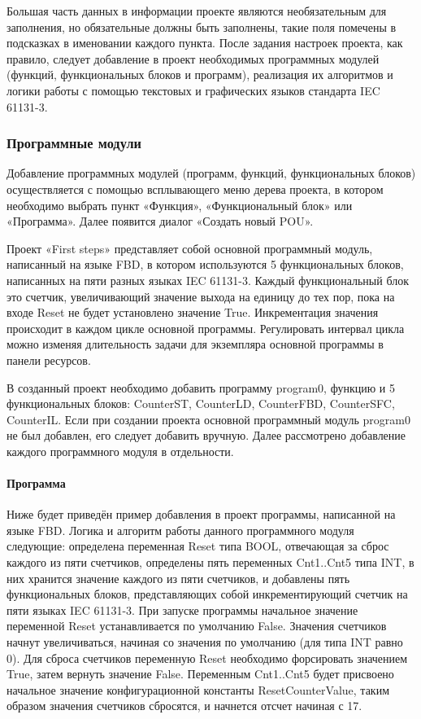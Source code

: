 \documentclass[letterpaper,10pt,russian]{sphinxmanual}
\begin{document}
Большая часть данных в информации проекте являются необязательным для
заполнения, но обязательные должны быть заполнены, такие поля помечены в
подсказках в именовании каждого пункта. После задания настроек проекта,
как правило, следует добавление в проект необходимых программных модулей
(функций, функциональных блоков и программ), реализация их алгоритмов и
логики работы с помощью текстовых и графических языков стандарта IEC
61131-3.


\subsubsection{Программные модули}
\label{usage_guide/work_with_project:id7}
Добавление программных модулей (программ, функций, функциональных
блоков) осуществляется с помощью всплывающего меню дерева проекта,
в котором необходимо выбрать пункт «Функция», «Функциональный
блок» или «Программа». Далее появится диалог «Создать новый POU».

Проект «First steps» представляет собой основной программный модуль,
написанный на языке FBD, в котором используются 5 функциональных блоков,
написанных на пяти разных языках IEC 61131-3. Каждый функциональный блок
это счетчик, увеличивающий значение выхода на единицу до тех пор, пока
на входе Reset не будет установлено значение True. Инкрементация
значения происходит в каждом цикле основной программы. Регулировать
интервал цикла можно изменяя длительность задачи для экземпляра основной
программы в панели ресурсов.

В созданный проект необходимо добавить программу program0, функцию и 5
функциональных блоков: CounterST, CounterLD, CounterFBD, CounterSFC,
CounterIL. Если при создании проекта основной программный модуль
program0 не был добавлен, его следует добавить вручную. Далее
рассмотрено добавление каждого программного модуля в отдельности.


\paragraph{Программа}
\label{usage_guide/work_with_project:id8}
Ниже будет приведён пример добавления в проект программы, написанной на
языке FBD. Логика и алгоритм работы данного программного модуля
следующие: определена переменная Reset типа BOOL, отвечающая за сброс
каждого из пяти счетчиков, определены пять переменных Cnt1..Cnt5 типа
INT, в них хранится значение каждого из пяти счетчиков, и добавлены пять
функциональных блоков, представляющих собой инкрементирующий счетчик на
пяти языках IEC 61131-3. При запуске программы начальное значение
переменной Reset устанавливается по умолчанию False. Значения счетчиков
начнут увеличиваться, начиная со значения по умолчанию (для типа INT
равно 0). Для сброса счетчиков переменную Reset необходимо форсировать
значением True, затем вернуть значение False. Переменным Cnt1..Cnt5
будет присвоено начальное значение конфигурационной константы
ResetCounterValue, таким образом значения счетчиков
сбросятся, и начнется отсчет начиная с 17.
\end{document}
